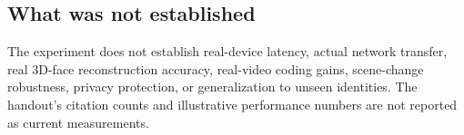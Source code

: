 \documentclass[a4paper,11pt]{article}
\begin{document}
\subsection*{What was not established}
The experiment does not establish real-device latency, actual network transfer, real 3D-face reconstruction accuracy, real-video coding gains, scene-change robustness, privacy protection, or generalization to unseen identities. The handout's citation counts and illustrative performance numbers are not reported as current measurements.
\end{document}
